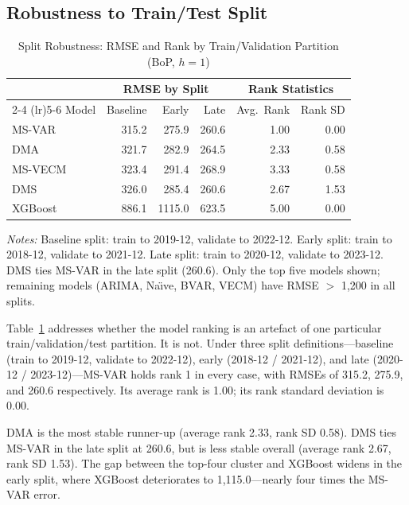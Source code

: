 \documentclass[12pt,a4paper]{article}
\begin{document}
\subsection{Robustness to Train/Test Split}

\begin{table}[htbp]
\centering
\caption{Split Robustness: RMSE and Rank by Train/Validation Partition (BoP, $h=1$)}
\label{tab:split_robustness}
\begin{tabular}{lrrr|rr}
\toprule
& \multicolumn{3}{c}{RMSE by Split} & \multicolumn{2}{c}{Rank Statistics} \\
\cmidrule(lr){2-4} \cmidrule(lr){5-6}
Model & Baseline & Early & Late & Avg.\ Rank & Rank SD \\
\midrule
MS-VAR & 315.2 & 275.9 & 260.6 & 1.00 & 0.00 \\
DMA & 321.7 & 282.9 & 264.5 & 2.33 & 0.58 \\
MS-VECM & 323.4 & 291.4 & 268.9 & 3.33 & 0.58 \\
DMS & 326.0 & 285.4 & 260.6 & 2.67 & 1.53 \\
XGBoost & 886.1 & 1115.0 & 623.5 & 5.00 & 0.00 \\
\bottomrule
\end{tabular}
\begin{tablenotes}
\small
\item \textit{Notes:} Baseline split: train to 2019-12, validate to 2022-12. Early split: train to 2018-12, validate to 2021-12. Late split: train to 2020-12, validate to 2023-12. DMS ties MS-VAR in the late split (260.6). Only the top five models shown; remaining models (ARIMA, Na\"{\i}ve, BVAR, VECM) have RMSE $>$ 1,200 in all splits.
\end{tablenotes}
\end{table}

Table~\ref{tab:split_robustness} addresses whether the model ranking is an artefact of one particular train/validation/test partition. It is not. Under three split definitions---baseline (train to 2019-12, validate to 2022-12), early (2018-12 / 2021-12), and late (2020-12 / 2023-12)---MS-VAR holds rank 1 in every case, with RMSEs of 315.2, 275.9, and 260.6 respectively. Its average rank is 1.00; its rank standard deviation is 0.00.

DMA is the most stable runner-up (average rank 2.33, rank SD 0.58). DMS ties MS-VAR in the late split at 260.6, but is less stable overall (average rank 2.67, rank SD 1.53). The gap between the top-four cluster and XGBoost widens in the early split, where XGBoost deteriorates to 1,115.0---nearly four times the MS-VAR error.
\end{document}
